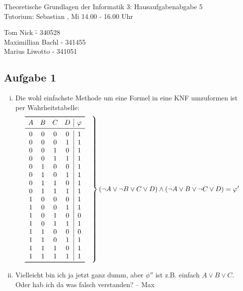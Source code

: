 \documentclass[a4paper,10pt]{article}
\begin{document}
\begin{center}
\Large{Theoretische Grundlagen der Informatik 3: Hausaufgabenabgabe 5} \\
\large{Tutorium: Sebastian , Mi 14.00 - 16.00 Uhr}
\end{center}
\begin{tabbing}
Tom Nick \hspace{2cm}\= - 340528\\
Maximillian Bachl \> - 341455 \\
Marius Liwotto\> -  341051
\end{tabbing}
\subsection*{Aufgabe 1}
\begin{enumerate}[(i)]
\item 	Die wohl einfachste Methode um eine Formel in eine KNF umzuformen ist per Wahrheitstabelle:
	\[
	\left.\begin{array}{cccc|c}
		\toprule 
		A & B & C & D & \varphi\\
		\midrule
		0 & 0 & 0 & 0 & 1\\
		0 & 0 & 0 & 1 & 1\\
		0 & 0 & 1 & 0 & 1\\
		0 & 0 & 1 & 1 & 1\\
		0 & 1 & 0 & 0 & 1\\
		0 & 1 & 0 & 1 & 1\\
		0 & 1 & 1 & 0 & 1\\
		0 & 1 & 1 & 1 & 1\\
		1 & 0 & 0 & 0 & 1\\
		1 & 0 & 0 & 1 & 1\\
		1 & 0 & 1 & 0 & 0\\
		1 & 0 & 1 & 1 & 1\\
		1 & 1 & 0 & 0 & 0\\
		1 & 1 & 0 & 1 & 1\\
		1 & 1 & 1 & 0 & 1\\
		1 & 1 & 1 & 1 & 1\\
		\bottomrule
		\end{array} \quad \right\} ( \lnot A \lor  \lnot B \lor C \lor D) \land (\lnot A \lor B \lor \lnot C \lor D) = \varphi'
	 \]
\item
	Vielleicht bin ich ja jetzt ganz dumm, aber $\phi''$ ist z.B. einfach $A \lor B \lor C$. Oder hab ich da was falsch verstanden? -- Max

\end{enumerate}
\end{document}
